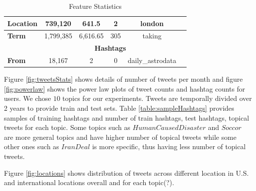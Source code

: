 \documentclass[letterpaper]{article}
\begin{document}
\begin{table}[t!]
{{\begin{tabular}{|l|c|c|c|c|r|}
\textbf{Location}                      & 739,120               & 641.5                 & 2                     & london                &                                     \\ \hline
\textbf{Term}                          & 1,799,385             & 6,616.65              & 305                   & taking                &                                     \\ \hline
\textbf{}                              & \multicolumn{4}{c|}{\textbf{Hashtags}}                                                        &                                     \\ \hline
\textbf{From}                          & 18,167                & 2                     & 0                     & daily\_astrodata      &                                     \\ \hline
\end{tabular}
}}
\caption{Feature Statistics}
\label{table:featureStatistics}
\end{table}

Figure \ref{fig:tweetsStats} shows details of number of tweets per month and figure \ref{fig:powerlaw} shows the power law plots of tweet counts and hashtag counts for users. We chose $10$ topics for our experiments. Tweets are temporally divided over 2 years to provide train and test sets. Table \ref{table:sampleHashtags} provides samples of training hashtags and number of train hashtags, test hashtags, topical tweets for each topic. Some topics such as $HumanCausedDisaster$ and $Soccor$ are more general topics and have higher number of topical tweets while some other ones such as $IranDeal$ is more specific, thus having less number of topical tweets.

Figure \ref{fig:locations} shows distribution of tweets across different location in U.S. and international locations overall and for each topic(?).
\end{document}
